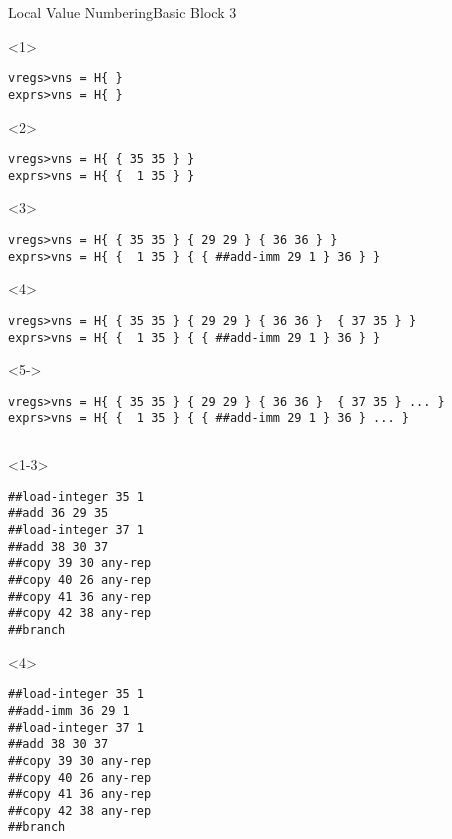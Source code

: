 \documentclass{beamer}
\begin{document}
\begin{frame}[fragile]{Local Value Numbering}{Basic Block 3}
  \begin{onlyenv}<1>
  \begin{Verbatim}
vregs>vns = H{ }
exprs>vns = H{ }
  \end{Verbatim}
  \end{onlyenv}
  \begin{onlyenv}<2>
  \begin{Verbatim}
vregs>vns = H{ { 35 35 } }
exprs>vns = H{ {  1 35 } }
  \end{Verbatim}
  \end{onlyenv}
  \begin{onlyenv}<3>
  \begin{Verbatim}
vregs>vns = H{ { 35 35 } { 29 29 } { 36 36 } }
exprs>vns = H{ {  1 35 } { { ##add-imm 29 1 } 36 } }
  \end{Verbatim}
  \end{onlyenv}
  \begin{onlyenv}<4>
  \begin{Verbatim}
vregs>vns = H{ { 35 35 } { 29 29 } { 36 36 }  { 37 35 } }
exprs>vns = H{ {  1 35 } { { ##add-imm 29 1 } 36 } }
  \end{Verbatim}
  \end{onlyenv}
  \begin{onlyenv}<5->
  \begin{Verbatim}
vregs>vns = H{ { 35 35 } { 29 29 } { 36 36 }  { 37 35 } ... }
exprs>vns = H{ {  1 35 } { { ##add-imm 29 1 } 36 } ... }
  \end{Verbatim}
  \end{onlyenv}
  \begin{columns}[t,onlytextwidth]
    \begin{column}[t]{.4\textwidth}
      \begin{onlyenv}<1-3>
      \begin{Verbatim}[frame=single]
##load-integer 35 1
##add 36 29 35
##load-integer 37 1
##add 38 30 37
##copy 39 30 any-rep
##copy 40 26 any-rep
##copy 41 36 any-rep
##copy 42 38 any-rep
##branch
      \end{Verbatim}
      \end{onlyenv}
      \begin{onlyenv}<4>
      \begin{Verbatim}[frame=single]
##load-integer 35 1
##add-imm 36 29 1
##load-integer 37 1
##add 38 30 37
##copy 39 30 any-rep
##copy 40 26 any-rep
##copy 41 36 any-rep
##copy 42 38 any-rep
##branch
      \end{Verbatim}

\end{onlyenv}
\end{column}
\end{columns}
\end{frame}
\end{document}
